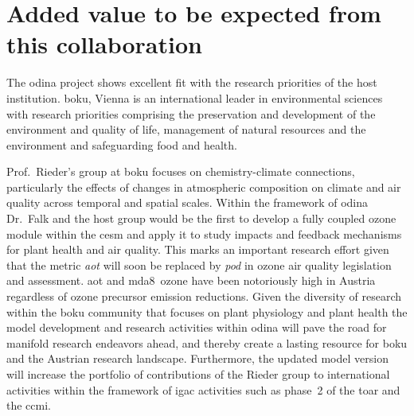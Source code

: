 \section{Added value to be expected from this collaboration}

The \gls{odina} project shows excellent fit with the research priorities of the host institution. \gls{boku}, Vienna is an international leader in environmental sciences with research priorities comprising the preservation and development of the environment and quality of life, management of natural resources and the environment and safeguarding food and health. 

Prof.~Rieder’s group at \gls{boku} focuses on chemistry-climate connections, particularly the effects of changes in atmospheric composition on climate and air quality across temporal and spatial scales. Within the framework of \gls{odina} Dr.~Falk and the host group would be the first to develop a fully coupled ozone module within the \gls{cesm} and apply it to study impacts and feedback mechanisms for plant health and air quality. This marks an important research effort given that the metric \emph{\gls{aot}} will soon be replaced by \emph{\gls{pod}} in ozone air quality legislation and assessment. \gls{aot} and \gls{mda8}~ozone have been notoriously high in Austria regardless of ozone precursor emission reductions. Given the diversity of research within the \gls{boku} community that focuses on plant physiology and plant health the model development and research activities within \gls{odina} will pave the road for manifold research endeavors ahead, and thereby create a lasting resource for \gls{boku} and the Austrian research landscape. Furthermore, the updated model version will increase the portfolio of contributions of the Rieder group to international activities within the framework of \gls{igac} activities such as phase~2 of the \gls{toar} and the \gls{ccmi}.

